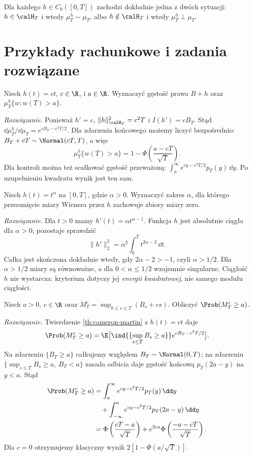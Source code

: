 \begin{wniosek}
Dla każdego $h\in C_0([0,T])$ zachodzi dokładnie jedna
z dwóch sytuacji: $h\in\calH_T$ i wtedy $\mu_T^h\sim\mu_T$,
albo $h\notin\calH_T$ i wtedy $\mu_T^h\perp\mu_T$.
\end{wniosek}

\section{Przykłady rachunkowe i zadania rozwiązane}

\begin{zadanie}
Niech $h(t)=ct$, $c\in\R$, i $a\in\R$.
Wyznaczyć gęstość prawa $B+h$ oraz
$\mu_T^h\{w:w(T)>a\}$.

\emph{Rozwiązanie.} Ponieważ $h'=c$,
$\|h\|_{\calH_T}^2=c^2T$ i $I(h')=cB_T$.
Stąd $\dd\mu_T^h/\dd\mu_T=e^{cB_T-c^2T/2}$.
Dla zdarzenia końcowego możemy liczyć bezpośrednio:
$B_T+cT\sim\Normal(cT,T)$, a więc
\[
\mu_T^h\{w(T)>a\}=1-\Phi\left(\frac{a-cT}{\sqrt T}\right).
\]
Dla kontroli można też scałkować gęstość przeważoną:
$\int_a^\infty e^{cy-c^2T/2}p_T(y)\,\dd y$.
Po uzupełnieniu kwadratu wynik jest ten sam.
\end{zadanie}

\begin{zadanie}
Niech $h(t)=t^\alpha$ na $[0,T]$, gdzie $\alpha>0$.
Wyznaczyć zakres $\alpha$, dla którego przesunięcie
miary Wienera przez $h$ zachowuje zbiory miary zero.

\emph{Rozwiązanie.} Dla $t>0$ mamy
$h'(t)=\alpha t^{\alpha-1}$. Funkcja $h$ jest
absolutnie ciągła dla $\alpha>0$; pozostaje sprawdzić
\[
\|h'\|_2^2=\alpha^2\int_0^T t^{2\alpha-2}\,\dd t.
\]
Całka jest skończona dokładnie wtedy, gdy
$2\alpha-2>-1$, czyli $\alpha>1/2$.
Dla $\alpha>1/2$ miary są równoważne, a dla
$0<\alpha\le1/2$ wzajemnie singularne.
Ciągłość $h$ nie wystarcza: kryterium dotyczy jej
\emph{energii kwadratowej}, nie samego modułu ciągłości.
\end{zadanie}

\begin{zadanie}
Niech $a>0$, $c\in\R$ oraz
$M_T^c=\sup_{0\le s\le T}(B_s+cs)$.
Obliczyć $\Prob(M_T^c\ge a)$.

\emph{Rozwiązanie.} Twierdzenie \ref{th:cameron-martin}
z $h(t)=ct$ daje
\[
\Prob(M_T^c\ge a)=\E\bigl[
\ind{\{\sup_{s\le T}B_s\ge a\}}e^{cB_T-c^2T/2}\bigr].
\]
Na zdarzeniu $\{B_T\ge a\}$ całkujemy względem
$B_T\sim\Normal(0,T)$; na zdarzeniu
$\{\sup_{s\le T}B_s\ge a,\ B_T<a\}$
zasada odbicia daje gęstość końcową $p_T(2a-y)$
na $y<a$. Stąd
\[
\begin{split}
\Prob(M_T^c\ge a)
&=\int_a^\infty e^{cy-c^2T/2}p_T(y)\,\dd y\\
&\quad+\int_{-\infty}^{a}e^{cy-c^2T/2}p_T(2a-y)\,\dd y\\
&=\Phi\left(\frac{cT-a}{\sqrt T}\right)
+e^{2ca}\Phi\left(\frac{-a-cT}{\sqrt T}\right).
\end{split}
\]
Dla $c=0$ otrzymujemy klasyczny wynik
$2[1-\Phi(a/\sqrt T)]$.
\end{zadanie}

